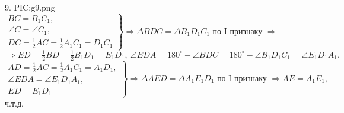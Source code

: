 9. {{PIC:g9.png}}\\
$\left.\begin{array}{l}BC=B_1C_1,\\
\angle C=\angle C_1,\\
DC=\frac{1}{2}AC=\frac{1}{2}A_1C_1=D_1C_1  \end{array}\right\}\Rightarrow
\Delta BDC=\Delta B_1D_1C_1\text{ по I признаку }\Rightarrow $\\$\Rightarrow ED=\frac{1}{2}BD=\frac{1}{2}B_1D_1=E_1D_1,\ \angle EDA=180^\circ-\angle BDC=180^\circ-\angle B_1D_1C_1=\angle E_1D_1A_1.$\\
$\left.\begin{array}{l}AD=\frac{1}{2}AC=\frac{1}{2}A_1C_1=A_1D_1,\\
\angle EDA=\angle E_1D_1A_1,\\
ED=E_1D_1  \end{array}\right\}\Rightarrow \Delta AED=\Delta A_1E_1D_1\text{ по I признаку }\Rightarrow AE=A_1E_1,$ ч.т.д.\\
